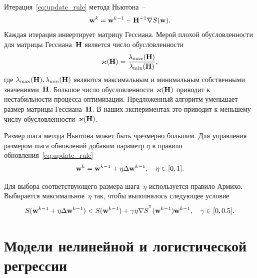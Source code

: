 Итерация~\eqref{eq:update_rule} метода Ньютона~--
\[
\mathbf{w}^k = \mathbf{w}^{k-1} - \mathbf{H}^{-1} \nabla S(\mathbf{w}).
\]
Каждая итерация инвертирует матрицу Гессиана.
Мерой плохой обусловленности для матрицы Гессиана~$\mathbf{H}$ является число обусловленности
\[
\varkappa(\mathbf{H}) = \frac{\lambda_{\text{max}}(\mathbf{H})}{\lambda_{\text{min}}(\mathbf{H})},
\]
где $\lambda_{\text{max}}(\mathbf{H}), \lambda_{\text{min}}(\mathbf{H})$ являются максимальным и минимальным собственными значениями~$\mathbf{H}$. Большое число обусловленности~$\varkappa (\mathbf{H})$ приводит к нестабильности процесса оптимизации.
Предложенный алгоритм уменьшает размер матрицы Гессиана~$\mathbf{H}$. В наших экспериментах это приводит к меньшему числу обусловленности~$\varkappa (\mathbf{H})$.

Размер шага метода Ньютона может быть чрезмерно большим. Для управления размером шага обновлений добавим параметр $\eta$ в правило обновления~\eqref{eq:update_rule}
\[
\mathbf{w}^k = \mathbf{w}^{k - 1} + \eta \Delta \mathbf{w}^{k - 1}, \quad \eta \in [0, 1].
\]

Для выбора соответствующего размера шага~$\eta$ используется правило Армихо. Выбирается максимальное~$\eta$ так, чтобы выполнялось следующее условие
\[
S(\bw^{k - 1} + \eta \Delta \bw^{k - 1}) < S(\bw^{k - 1}) + \gamma \eta \nabla S^{\T}(\bw^{k-1})\bw^{k - 1}, \quad \gamma \in [0, 0.5].
\]

\section{Модели нелинейной и логистической регрессии}

